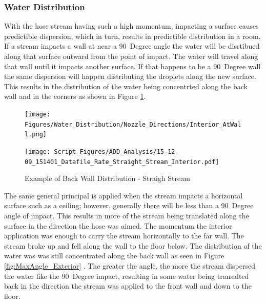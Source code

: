\documentclass[12pt,oneside]{book}
\begin{document}
\subsubsection{Water Distribution}

With the hose stream having such a high momentum, impacting a surface causes predictible dispersion, which in turn, results in predictible distribution in a room. If a stream impacts a wall at near a 90~Degree angle the water will be disrtibued along that surface outward from the point of impact. The water will travel along that wall until it impacts another surface. If that happens to be a 90~Degree wall the same dispersion will happen distributing the droplets along the new surface. This results in the distribution of the water being concentrted along the back wall and in the corners as shown in Figure \ref{fig:Interior_Atwall_Example}.

\begin{figure}[H]
	\centering
	\begin{minipage}[b]{0.45\textwidth}
	\centering
	\texttt{[image: Figures/Water\_Distribution/Nozzle\_Directions/Interior\_AtWall.png]} 
	\end{minipage}
	\begin{minipage}[b]{0.45\textwidth}
	\centering
	\texttt{[image: Script\_Figures/ADD\_Analysis/15-12-09\_151401\_Datafile\_Rate\_Straight\_Stream\_Interior.pdf]}
	\end{minipage}
	\caption{Example of Back Wall Distribution - Straigh Stream}
	\label{fig:Interior_Atwall_Example}
\end{figure}

The same general principal is applied when the stream impacts a horizontal surface such as a ceiling; however, generally there will be less than a 90~Degree angle of impact. This results in more of the stream being translated along the surface in the direction the hose was aimed. The momentum the interior application was enough to carry the stream horizontally to the far wall. The stream broke up and fell along the wall to the floor below. The distribution of the water was was still concentrated along the back wall as seen in Figure \ref{fig:MaxAngle_Exterior} . The greater the angle, the more the stream dispersed the water like the 90~Degree impact, resulting in some water being transalted back in the direction the stream was applied to the front wall and down to the floor.
\end{document}
